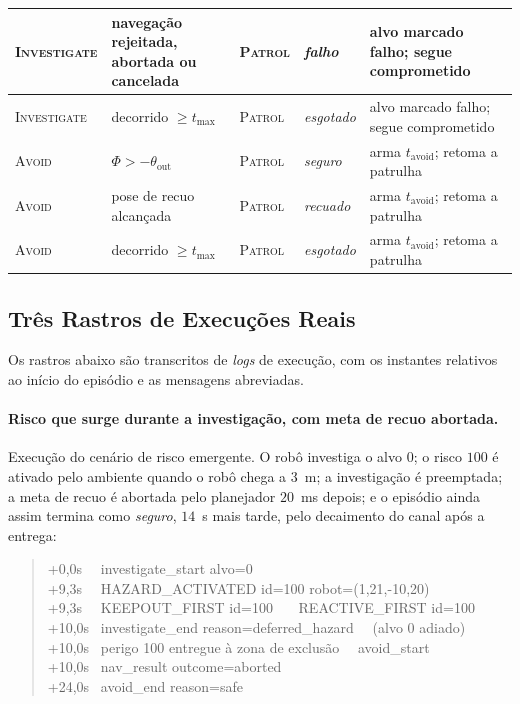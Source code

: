 \begin{table}[htb]
\begin{tabular}{p{}p{}p{}p{}p{}}
\hline
\textsc{Investigate} & navegação rejeitada, abortada ou cancelada &
\textsc{Patrol} & \emph{falho} & alvo marcado falho; segue comprometido\\
\hline
\textsc{Investigate} & decorrido $\ge t_{\max}$ &
\textsc{Patrol} & \emph{esgotado} & alvo marcado falho; segue comprometido\\
\hline
\textsc{Avoid} & $\Phi>-\theta_{\text{out}}$ &
\textsc{Patrol} & \emph{seguro} & arma $t_{\text{avoid}}$; retoma a patrulha\\
\hline
\textsc{Avoid} & pose de recuo alcançada &
\textsc{Patrol} & \emph{recuado} & arma $t_{\text{avoid}}$; retoma a patrulha\\
\hline
\textsc{Avoid} & decorrido $\ge t_{\max}$ &
\textsc{Patrol} & \emph{esgotado} & arma $t_{\text{avoid}}$; retoma a patrulha\\
\hline
\end{tabular}
\end{table}

\subsection{Três Rastros de Execuções Reais}

Os rastros abaixo são transcritos de \textit{logs} de execução, com os instantes
relativos ao início do episódio e as mensagens abreviadas.

\paragraph{Risco que surge durante a investigação, com meta de recuo abortada.}
Execução do cenário de risco emergente. O robô investiga o alvo $0$; o risco $100$ é
ativado pelo ambiente quando o robô chega a $3$~m; a investigação é preemptada; a meta
de recuo é abortada pelo planejador $20$~ms depois; e o episódio ainda assim termina
como \emph{seguro}, $14$~s mais tarde, pelo decaimento do canal após a entrega:

\begin{quote}\footnotesize\ttfamily
+0{,}0\;s \ \ investigate\_start alvo=0\\
+9{,}3\;s \ \ HAZARD\_ACTIVATED id=100 robot=(1{,}21,-10{,}20)\\
+9{,}3\;s \ \ KEEPOUT\_FIRST id=100 \ \ \ REACTIVE\_FIRST id=100\\
+10{,}0\;s \ investigate\_end reason=deferred\_hazard \ \ (alvo 0 adiado)\\
+10{,}0\;s \ perigo 100 entregue à zona de exclusão \ \ avoid\_start\\
+10{,}0\;s \ nav\_result outcome=aborted\\
+24{,}0\;s \ avoid\_end reason=safe
\end{quote}

